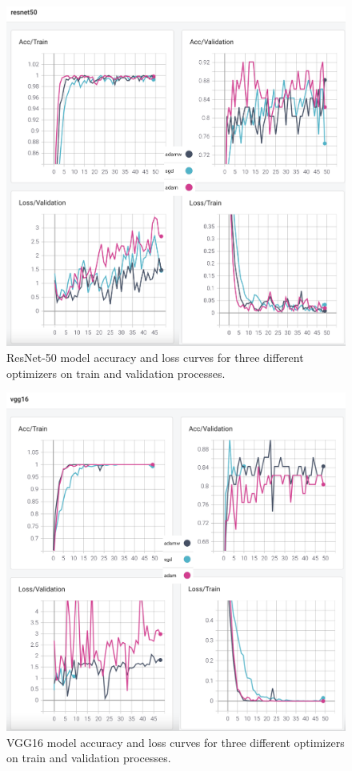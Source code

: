 \begin{figure}[!h]
	\centering
	\includegraphics[width=\linewidth]{fig/resnet50.png}
	\vspace{2mm}
	\caption{ResNet-50 model accuracy and loss curves for three different optimizers on train and validation processes.}
	\label{fig:resnet50_plots}
\end{figure}

\begin{figure}[!h]
	\centering
	\includegraphics[width=\linewidth]{fig/vgg16.png}
	\vspace{2mm}
	\caption{VGG16 model accuracy and loss curves for three different optimizers on train and validation processes.}
	\label{fig:vgg16_plots}
\end{figure}


